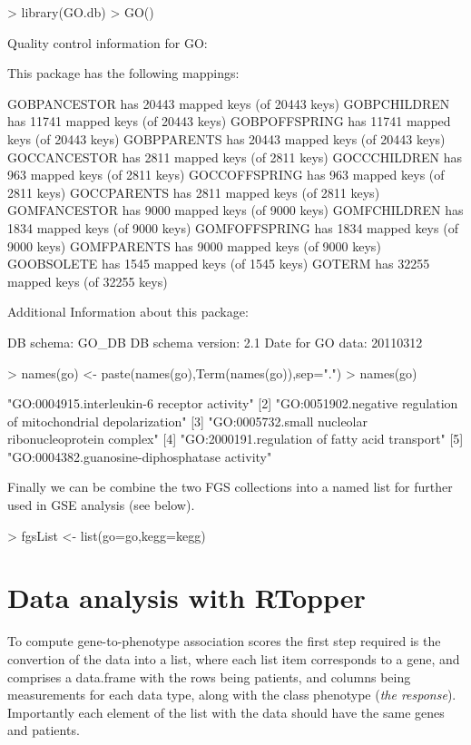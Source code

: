 \documentclass[11pt]{article}
\begin{document}
\begin{Schunk}
\begin{Sinput}
> library(GO.db)
> GO()
\end{Sinput}
\begin{Soutput}
Quality control information for GO:


This package has the following mappings:

GOBPANCESTOR has 20443 mapped keys (of 20443 keys)
GOBPCHILDREN has 11741 mapped keys (of 20443 keys)
GOBPOFFSPRING has 11741 mapped keys (of 20443 keys)
GOBPPARENTS has 20443 mapped keys (of 20443 keys)
GOCCANCESTOR has 2811 mapped keys (of 2811 keys)
GOCCCHILDREN has 963 mapped keys (of 2811 keys)
GOCCOFFSPRING has 963 mapped keys (of 2811 keys)
GOCCPARENTS has 2811 mapped keys (of 2811 keys)
GOMFANCESTOR has 9000 mapped keys (of 9000 keys)
GOMFCHILDREN has 1834 mapped keys (of 9000 keys)
GOMFOFFSPRING has 1834 mapped keys (of 9000 keys)
GOMFPARENTS has 9000 mapped keys (of 9000 keys)
GOOBSOLETE has 1545 mapped keys (of 1545 keys)
GOTERM has 32255 mapped keys (of 32255 keys)


Additional Information about this package:

DB schema: GO_DB
DB schema version: 2.1
Date for GO data: 20110312
\end{Soutput}
\begin{Sinput}
> names(go) <- paste(names(go),Term(names(go)),sep=".")
> names(go)
\end{Sinput}
\begin{Soutput}
[1] "GO:0004915.interleukin-6 receptor activity"                    
[2] "GO:0051902.negative regulation of mitochondrial depolarization"
[3] "GO:0005732.small nucleolar ribonucleoprotein complex"          
[4] "GO:2000191.regulation of fatty acid transport"                 
[5] "GO:0004382.guanosine-diphosphatase activity"                   
\end{Soutput}
\end{Schunk}

Finally we can be combine the two FGS collections into a named list for further used
in GSE analysis (see below).

\begin{Schunk}
\begin{Sinput}
> fgsList <- list(go=go,kegg=kegg)
\end{Sinput}
\end{Schunk}

\section{Data analysis with RTopper}
To compute gene-to-phenotype association scores the first step required 
is the convertion of the data into a list, where each list item corresponds to a gene, 
and comprises a data.frame with the rows being patients, and columns being measurements 
for each data type, along with the class phenotype ({\it the response}).
Importantly each element of the list with the data should have the same genes and patients.
\end{document}
